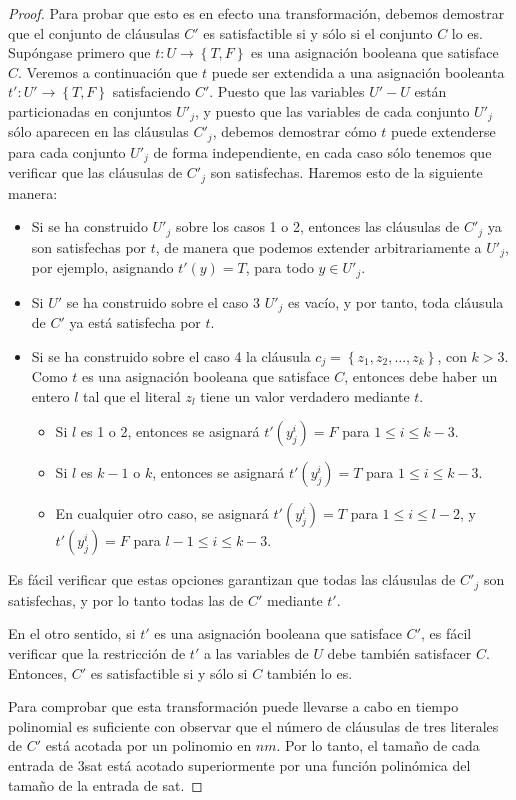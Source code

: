 \documentclass[11pt, a4paper]{memoir}
\begin{document}
\begin{proof}
\vspace{0.5cm}

Para probar que esto es en efecto una transformación, debemos demostrar que el conjunto de cláusulas $C'$ es satisfactible si y sólo si el conjunto $C$ lo es. Supóngase primero que $t:U\rightarrow \left \{T,F \right \}$ es una asignación booleana que satisface $C$. Veremos a continuación que $t$ puede ser extendida a una asignación booleanta $t':U'\rightarrow \left \{T,F \right \}$ satisfaciendo $C'$. Puesto que las variables $U' - U$ están particionadas en conjuntos $U'_j$, y puesto que las variables de cada conjunto $U'_j$ sólo aparecen en las cláusulas $C'_j$, debemos demostrar cómo $t$ puede extenderse para cada conjunto $U'_j$ de forma independiente, en cada caso sólo tenemos que verificar que las cláusulas de $C'_j$ son satisfechas. Haremos esto de la siguiente manera:

\begin{itemize}
	\item Si se ha construido $U'_j$ sobre los casos 1 o 2, entonces las cláusulas de $C'_j$ ya son satisfechas por $t$, de manera que podemos extender arbitrariamente a $U'_j$, por ejemplo, asignando $t'(y) = T$, para todo $y\in U'_j$. 
	\item Si $U'$ se ha construido sobre el caso 3 $U'_j$ es vacío, y por tanto, toda cláusula de $C'$ ya está satisfecha por $t$.
	\item Si se ha construido sobre el caso 4 la cláusula $c_j=\left \{ z_1, z_2, \dots, z_k \right \}$, con $k > 3$. Como $t$ es una asignación booleana que satisface $C$, entonces debe haber un entero $l$ tal que el literal $z_l$ tiene un valor verdadero mediante $t$.  
	\begin{itemize} 
	\item Si $l$ es 1 o 2, entonces se asignará $t'(y^i_j) = F$ para $1 \le i \le k - 3$.
	\item Si $l$ es $k - 1$ o $k$, entonces se asignará  $t'(y^i_j) = T$  para $1 \le i \le k - 3$.
	\item En cualquier otro caso, se asignará  $t'(y^i_j) = T$  para $1 \le i \le l - 2$, y $t'(y^i_j) = F$  para $l -1 \le i \le k - 3$.
	\end{itemize} 
\end{itemize}
Es fácil verificar que estas opciones garantizan que todas las cláusulas de $C'_j$ son satisfechas, y por lo tanto todas las de $C'$ mediante $t'$.  

En el otro sentido, si $t'$ es una asignación booleana que satisface $C'$, es fácil verificar que la restricción de $t'$ a las variables de $U$ debe también satisfacer $C$. Entonces, $C'$ es satisfactible si y sólo si $C$ también lo es.

Para comprobar que esta transformación puede llevarse a cabo en tiempo polinomial es suficiente con observar que el número de cláusulas de tres literales de $C'$ está acotada por un polinomio en $nm$. Por lo tanto, el tamaño de cada entrada de \gls{3sat} está acotado superiormente por una función polinómica del tamaño de la entrada de \gls{sat}. 

\end{proof}


\clearpage
\printglossary[type=\acronymtype]
\end{document}
